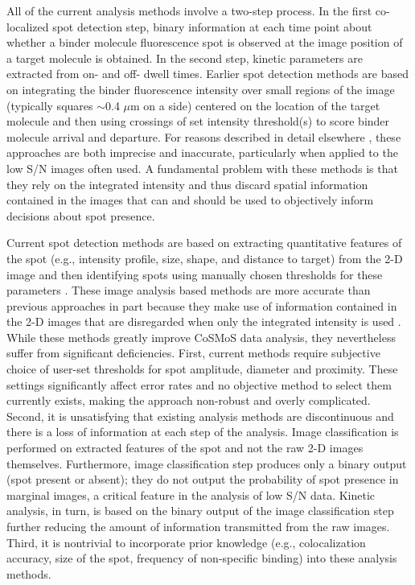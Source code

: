All of the current analysis methods involve a two-step process. In the first co-localized spot detection step, binary information at each time point about whether a binder molecule fluorescence spot is observed at the image position of a target molecule is obtained. In the second step, kinetic parameters are extracted from on- and off- dwell times. Earlier spot detection methods are based on integrating the binder fluorescence intensity over small regions of the image (typically squares $\sim$0.4 $\mu$m on a side) centered on the location of the target molecule and then using crossings of set intensity threshold(s) to score binder molecule arrival and departure. For reasons described in detail elsewhere \citep{Friedman2015-nx}, these approaches are both imprecise and inaccurate, particularly when applied to the low S/N images often used. A fundamental problem with these methods is that they rely on the integrated intensity and thus discard spatial information contained in the images that can and should be used to objectively inform decisions about spot presence.

Current spot detection methods are based on extracting quantitative features of the spot (e.g., intensity profile, size, shape, and distance to target) from the 2-D image and then identifying spots using manually chosen thresholds for these parameters \citep{Friedman2015-nx, Smith2019-ns}. These image analysis based methods are more accurate than previous approaches in part because they make use of information contained in the 2-D images that are disregarded when only the integrated intensity is used \citep{friedman_cosmos_analysis_2015}. While these methods greatly improve CoSMoS data analysis, they nevertheless suffer from significant deficiencies. First, current methods require subjective choice of user-set thresholds for spot amplitude, diameter and proximity. These settings significantly affect error rates and no objective method to select them currently exists, making the approach non-robust and overly complicated. Second, it is unsatisfying that existing analysis methods are discontinuous and there is a loss of information at each step of the analysis. Image classification is performed on extracted features of the spot and not the raw 2-D images themselves. Furthermore, image classification step produces only a binary output (spot present or absent); they do not output the probability of spot presence in marginal images, a critical feature in the analysis of low S/N data. Kinetic analysis, in turn, is based on the binary output of the image classification step further reducing the amount of information transmitted from the raw images. Third, it is nontrivial to incorporate prior knowledge (e.g., colocalization accuracy, size of the spot, frequency of non-specific binding) into these analysis methods.

